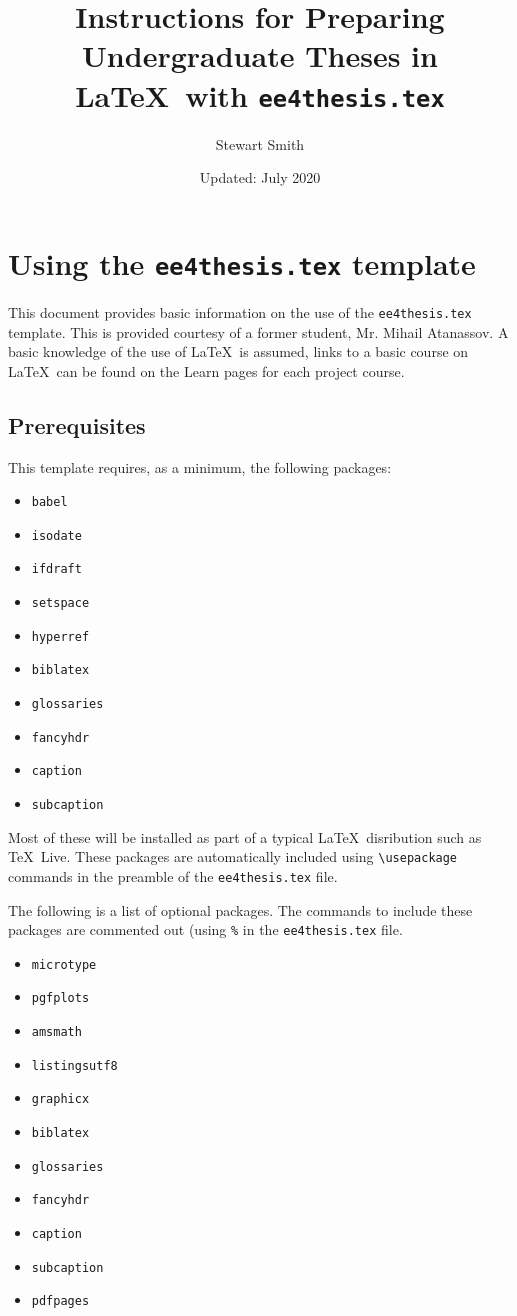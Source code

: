 \documentclass[a4paper,12pt]{article}
\begin{document}
\title{Instructions for Preparing Undergraduate Theses in \LaTeX~with \texttt{ee4thesis.tex}}
\author{Stewart Smith}
\date{Updated: July 2020}
\maketitle

\section{Using the \texttt{ee4thesis.tex} template}

This document provides basic information on the use of the \verb+ee4thesis.tex+
template.  This is provided courtesy of a former student, Mr. Mihail Atanassov.
A basic knowledge of the use of \LaTeX~is assumed, links to a basic course on
\LaTeX~can be found on the Learn pages for each project course.

\subsection{Prerequisites}

This template requires, as a minimum, the following packages:
\begin{itemize}
	\item \verb+babel+
	\item \verb+isodate+
	\item \verb+ifdraft+
	\item \verb+setspace+
	\item \verb+hyperref+
	\item \verb+biblatex+
	\item \verb+glossaries+
	\item \verb+fancyhdr+
	\item \verb+caption+
	\item \verb+subcaption+
\end{itemize}

Most of these will be installed as part of a typical \LaTeX~disribution such as
\TeX~Live. These packages are automatically included using \verb+\usepackage+
commands in the preamble of the \verb+ee4thesis.tex+ file.

The following is a list of optional packages. The commands to include these
packages are commented out (using \verb+%+ in the \verb+ee4thesis.tex+ file.

\begin{itemize}
	\item \verb+microtype+
	\item \verb+pgfplots+
	\item \verb+amsmath+
	\item \verb+listingsutf8+
	\item \verb+graphicx+
	\item \verb+biblatex+
	\item \verb+glossaries+
	\item \verb+fancyhdr+
	\item \verb+caption+
	\item \verb+subcaption+
	\item \verb+pdfpages+
\end{itemize}
\end{document}
